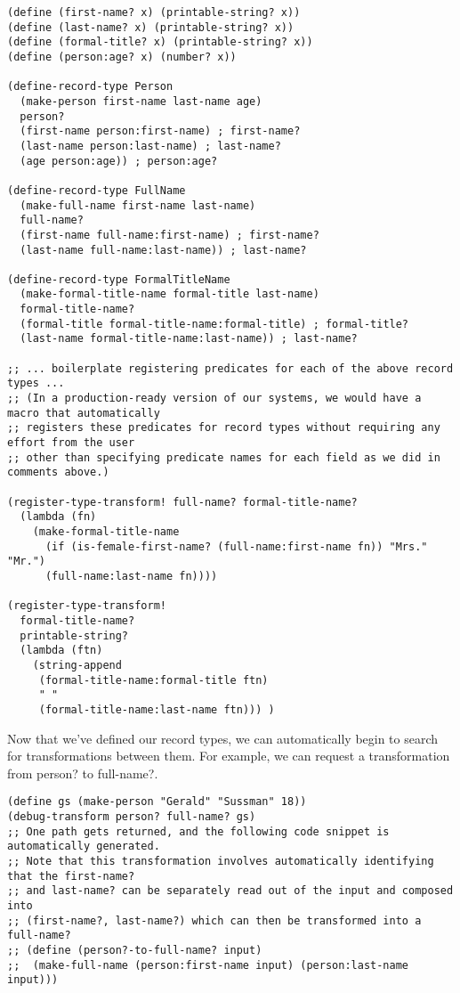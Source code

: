 \documentclass[letterpaper]{article}
\begin{document}
\begin{verbatim}
(define (first-name? x) (printable-string? x))
(define (last-name? x) (printable-string? x))
(define (formal-title? x) (printable-string? x))
(define (person:age? x) (number? x))

(define-record-type Person
  (make-person first-name last-name age)
  person?
  (first-name person:first-name) ; first-name?
  (last-name person:last-name) ; last-name?
  (age person:age)) ; person:age?

(define-record-type FullName
  (make-full-name first-name last-name)
  full-name?
  (first-name full-name:first-name) ; first-name?
  (last-name full-name:last-name)) ; last-name?

(define-record-type FormalTitleName
  (make-formal-title-name formal-title last-name)
  formal-title-name?
  (formal-title formal-title-name:formal-title) ; formal-title?
  (last-name formal-title-name:last-name)) ; last-name?

;; ... boilerplate registering predicates for each of the above record types ...
;; (In a production-ready version of our systems, we would have a macro that automatically
;; registers these predicates for record types without requiring any effort from the user
;; other than specifying predicate names for each field as we did in comments above.)

(register-type-transform! full-name? formal-title-name? 
  (lambda (fn)
    (make-formal-title-name 
      (if (is-female-first-name? (full-name:first-name fn)) "Mrs." "Mr.")
      (full-name:last-name fn))))

(register-type-transform! 
  formal-title-name?
  printable-string? 
  (lambda (ftn) 
    (string-append 
     (formal-title-name:formal-title ftn) 
     " "
     (formal-title-name:last-name ftn))) )
\end{verbatim}

Now that we've defined our record types, we can automatically begin to search for transformations between them. For example, we can request a transformation from person? to full-name?.

\begin{verbatim}
(define gs (make-person "Gerald" "Sussman" 18))
(debug-transform person? full-name? gs)
;; One path gets returned, and the following code snippet is automatically generated.
;; Note that this transformation involves automatically identifying that the first-name? 
;; and last-name? can be separately read out of the input and composed into 
;; (first-name?, last-name?) which can then be transformed into a full-name?
;; (define (person?-to-full-name? input)
;;  (make-full-name (person:first-name input) (person:last-name input)))
\end{verbatim}
\end{document}
